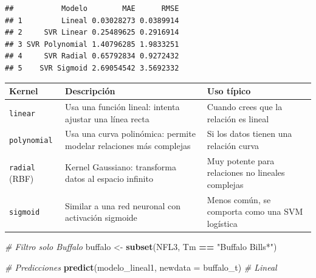 \documentclass[
]{article}
\newenvironment{Shaded}{\begin{snugshade}}{\end{snugshade}}
\newcommand{\AttributeTok}[1]{\textcolor[rgb]{0.13,0.29,0.53}{#1}}
\newcommand{\CommentTok}[1]{\textcolor[rgb]{0.56,0.35,0.01}{\textit{#1}}}
\newcommand{\FunctionTok}[1]{\textcolor[rgb]{0.13,0.29,0.53}{\textbf{#1}}}
\newcommand{\NormalTok}[1]{#1}
\newcommand{\OtherTok}[1]{\textcolor[rgb]{0.56,0.35,0.01}{#1}}
\newcommand{\SpecialCharTok}[1]{\textcolor[rgb]{0.81,0.36,0.00}{\textbf{#1}}}
\newcommand{\StringTok}[1]{\textcolor[rgb]{0.31,0.60,0.02}{#1}}
\begin{document}
\begin{verbatim}
##           Modelo        MAE      RMSE
## 1         Lineal 0.03028273 0.0389914
## 2     SVR Linear 0.25489625 0.2916914
## 3 SVR Polynomial 1.40796285 1.9833251
## 4     SVR Radial 0.65792834 0.9272432
## 5    SVR Sigmoid 2.69054542 3.5692332
\end{verbatim}

\begin{longtable}[]{@{}
  >{\raggedright\arraybackslash}p{}
  >{\raggedright\arraybackslash}p{}
  >{\raggedright\arraybackslash}p{}@{}}
\toprule\noalign{}
\begin{minipage}[b]{\linewidth}\raggedright
Kernel
\end{minipage} & \begin{minipage}[b]{\linewidth}\raggedright
Descripción
\end{minipage} & \begin{minipage}[b]{\linewidth}\raggedright
Uso típico
\end{minipage} \\
\midrule\noalign{}
\endhead
\bottomrule\noalign{}
\endlastfoot
\texttt{linear} & Usa una función lineal: intenta ajustar una línea
recta & Cuando crees que la relación es lineal \\
\texttt{polynomial} & Usa una curva polinómica: permite modelar
relaciones más complejas & Si los datos tienen una relación curva \\
\texttt{radial} (RBF) & Kernel Gaussiano: transforma datos al espacio
infinito & Muy potente para relaciones no lineales complejas \\
\texttt{sigmoid} & Similar a una red neuronal con activación sigmoide &
Menos común, se comporta como una SVM logística \\
\end{longtable}

\begin{Shaded}
\begin{Highlighting}[]
\CommentTok{\# Filtro solo Buffalo}
\NormalTok{buffalo }\OtherTok{\textless{}{-}} \FunctionTok{subset}\NormalTok{(NFL3, Tm }\SpecialCharTok{==} \StringTok{"Buffalo Bills*"}\NormalTok{)}

\CommentTok{\# Predicciones}
\FunctionTok{predict}\NormalTok{(modelo\_lineal1, }\AttributeTok{newdata =}\NormalTok{ buffalo\_t)       }\CommentTok{\# Lineal}
\end{Highlighting}
\end{Shaded}
\end{document}
